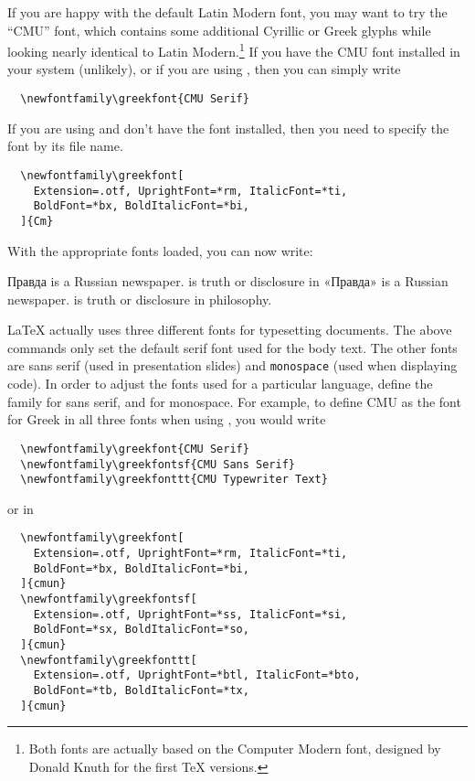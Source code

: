 If you are happy with the default Latin Modern font, you may want to try the
\enquote{CMU} font, which contains some additional Cyrillic or Greek glyphs
while looking nearly identical to Latin Modern.\footnote{Both fonts are
  actually based on the Computer Modern font, designed by Donald Knuth for the
  first \TeX{} versions.}
If you have the CMU font installed in your system (unlikely), or if you are
using , then you can simply write
\begin{verbatim}
  \newfontfamily\greekfont{CMU Serif}
\end{verbatim}
If you are using  and don't have the font installed, then you
need to specify the font by its file name.
\begin{verbatim}
  \newfontfamily\greekfont[
    Extension=.otf, UprightFont=*rm, ItalicFont=*ti,
    BoldFont=*bx, BoldItalicFont=*bi,
  ]{Cm}
\end{verbatim}

With the appropriate fonts loaded, you can now write:
\begin{example}[examplewidth=0.8\linewidth, vertical_mode,noextend]
\newfontfamily{}
\newfontfamily{}

\begin{chktexignore} %
\textrussian{Правда} is a Russian newspaper. %
 is truth or disclosure in %
\textrussian{«Правда»} is a Russian newspaper.
 is truth or disclosure in
philosophy.
\end{chktexignore} %
\end{example}

\LaTeX{} actually uses three different fonts for typesetting documents. The
above commands only set the default serif font used for the body text. The
other fonts are \textsf{sans serif} (used in presentation slides) and
\texttt{monospace} (used when displaying code). In order to adjust the fonts
used for a particular language, define the 
family for sans serif, and  for monospace. For
example, to define CMU as the font for Greek in all three fonts when using
, you would write
\begin{verbatim}
  \newfontfamily\greekfont{CMU Serif}
  \newfontfamily\greekfontsf{CMU Sans Serif}
  \newfontfamily\greekfonttt{CMU Typewriter Text}
\end{verbatim}
\pagebreak[3]
or in 
\begin{verbatim}
  \newfontfamily\greekfont[
    Extension=.otf, UprightFont=*rm, ItalicFont=*ti,
    BoldFont=*bx, BoldItalicFont=*bi,
  ]{cmun}
  \newfontfamily\greekfontsf[
    Extension=.otf, UprightFont=*ss, ItalicFont=*si,
    BoldFont=*sx, BoldItalicFont=*so,
  ]{cmun}
  \newfontfamily\greekfonttt[
    Extension=.otf, UprightFont=*btl, ItalicFont=*bto,
    BoldFont=*tb, BoldItalicFont=*tx,
  ]{cmun}
\end{verbatim}

